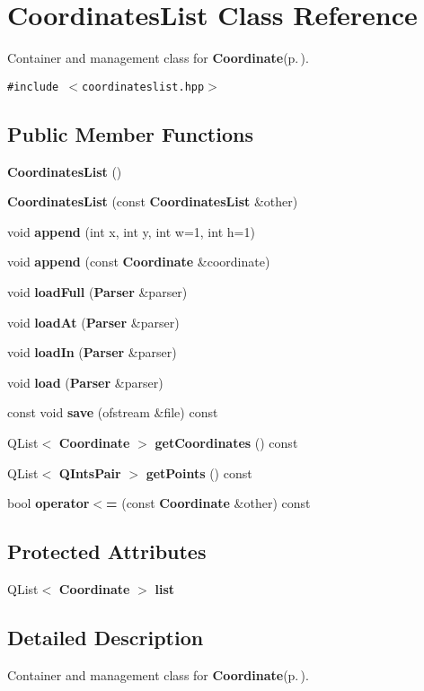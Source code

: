 \section{Coordinates\-List Class Reference}
\label{classCoordinatesList}
Container and management class for {\bf Coordinate}{\rm (p.\,\pageref{classCoordinate})}.  


{\tt \#include $<$coordinateslist.hpp$>$}

\subsection*{Public Member Functions}
\begin{CompactItemize}
\item 
{\bf Coordinates\-List} ()
\item 
{\bf Coordinates\-List} (const {\bf Coordinates\-List} \&other)
\item 
void {\bf append} (int x, int y, int w=1, int h=1)
\item 
void {\bf append} (const {\bf Coordinate} \&coordinate)
\item 
void {\bf load\-Full} ({\bf Parser} \&parser)
\item 
void {\bf load\-At} ({\bf Parser} \&parser)
\item 
void {\bf load\-In} ({\bf Parser} \&parser)
\item 
void {\bf load} ({\bf Parser} \&parser)
\item 
const void {\bf save} (ofstream \&file) const 
\item 
QList$<$ {\bf Coordinate} $>$ {\bf get\-Coordinates} () const 
\item 
QList$<$ {\bf QInts\-Pair} $>$ {\bf get\-Points} () const 
\item 
bool {\bf operator$<$=} (const {\bf Coordinate} \&other) const 
\end{CompactItemize}
\subsection*{Protected Attributes}
\begin{CompactItemize}
\item 
QList$<$ {\bf Coordinate} $>$ {\bf list}
\end{CompactItemize}


\subsection{Detailed Description}
Container and management class for {\bf Coordinate}{\rm (p.\,\pageref{classCoordinate})}. 



